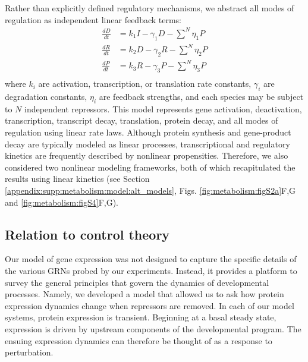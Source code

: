 Rather than explicitly defined regulatory mechanisms, we abstract all modes of regulation as independent linear feedback terms:
\begin{equation}
\begin{aligned}
\frac{dD}{dt}&=k_1I-\gamma_1D - \sum\limits_{}^{N} \eta_{1}P \\
\frac{dR}{dt}&=k_2D-\gamma_2R - \sum\limits_{}^{N} \eta_{2}P \\
\frac{dP}{dt}&=k_3R-\gamma_3P - \sum\limits_{}^{N} \eta_{3}P \\
\end{aligned}
\end{equation}
where $k_i$ are activation, transcription, or translation rate constants, $\gamma_i$ are degradation constants, $\eta_i$ are feedback strengths, and each species may be subject to $N$ independent repressors. This model represents gene activation, deactivation, transcription, transcript decay, translation, protein decay, and all modes of regulation using linear rate laws. Although protein synthesis and gene-product decay are typically modeled as linear processes, transcriptional and regulatory kinetics are frequently described by nonlinear propensities. Therefore, we also considered two nonlinear modeling frameworks, both of which recapitulated the results using linear kinetics (see Section \ref{appendix:supp:metabolism:model:alt_models}, Figs. \ref{fig:metabolism:figS2a}F,G and \ref{fig:metabolism:figS4}F,G).

\subsection{Relation to control theory}
\label{appendix:supp:metabolism:model:controls}

Our model of gene expression was not designed to capture the specific details of the various GRNs probed by our experiments. Instead, it provides a platform to survey the general principles that govern the dynamics of developmental processes. Namely, we developed a model that allowed us to ask how protein expression dynamics change when repressors are removed. In each of our model systems, protein expression is transient. Beginning at a basal steady state, expression is driven by upstream components of the developmental program. The ensuing expression dynamics can therefore be thought of as a response to perturbation.

